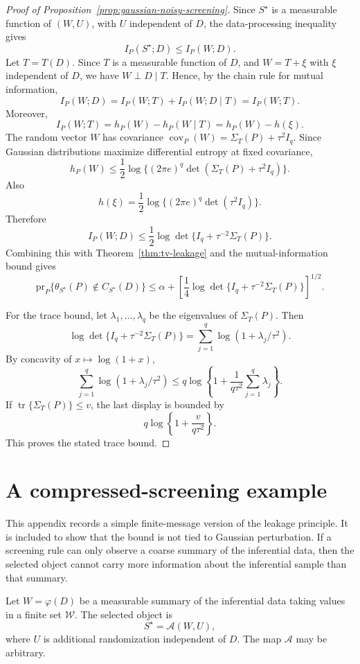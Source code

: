 \documentclass[11pt]{article}
\begin{document}
\begin{proof}[Proof of Proposition~\ref{prop:gaussian-noisy-screening}]
	Since \(S^\star\) is a measurable function of \((W,U)\), with \(U\) independent of \(D\), the data-processing inequality gives
	\[
	I_P(S^\star;D)\leq I_P(W;D).
	\]
	Let \(T=T(D)\). Since \(T\) is a measurable function of \(D\), and
	\(W=T+\xi\) with \(\xi\) independent of \(D\), we have
	\(W\perp D\mid T\). Hence, by the chain rule for mutual information,
	\[
	I_P(W;D)
	=
	I_P(W;T)+I_P(W;D\mid T)
	=
	I_P(W;T).
	\]
	Moreover,
	\[
	I_P(W;T)
	=
	h_P(W)-h_P(W\mid T)
	=
	h_P(W)-h(\xi).
	\]
	The random vector \(W\) has covariance \(\operatorname{cov}_P(W)=\Sigma_T(P)+\tau^2 I_q.\)
	Since Gaussian distributions maximize differential entropy at fixed covariance,
	\[
	h_P(W)
	\leq
	\frac12\log\{(2\pi e)^q\det(\Sigma_T(P)+\tau^2 I_q)\}.
	\]
	Also
	\[
	h(\xi)
	=
	\frac12\log\{(2\pi e)^q\det(\tau^2 I_q)\}.
	\]
	Therefore
	\[
	I_P(W;D)
	\leq
	\frac12
	\log\det\{I_q+\tau^{-2}\Sigma_T(P)\}.
	\]
	Combining this with Theorem~\ref{thm:tv-leakage} and the mutual-information bound gives
	\[
	\mathrm{pr}_P\{\theta_{S^\star}(P)\notin C_{S^\star}(D)\}
	\leq
	\alpha+
	\left[
	\frac14
	\log\det\{I_q+\tau^{-2}\Sigma_T(P)\}
	\right]^{1/2}.
	\]
	
	For the trace bound, let \(\lambda_1,\ldots,\lambda_q\) be the eigenvalues of \(\Sigma_T(P)\). Then
	\[
	\log\det\{I_q+\tau^{-2}\Sigma_T(P)\}
	=
	\sum_{j=1}^q\log(1+\lambda_j/\tau^2).
	\]
	By concavity of \(x\mapsto\log(1+x)\),
	\[
	\sum_{j=1}^q\log(1+\lambda_j/\tau^2)
	\leq
	q\log\left\{
	1+\frac{1}{q\tau^2}\sum_{j=1}^q\lambda_j
	\right\}.
	\]
	If \(\operatorname{tr}\{\Sigma_T(P)\}\leq v\), the last display is bounded by
	\[
	q\log\left\{1+\frac{v}{q\tau^2}\right\}.
	\]
	This proves the stated trace bound.
\end{proof}

\section{A compressed-screening example}
\label{app:compressed}

This appendix records a simple finite-message version of the leakage principle. It is included to show that the bound is not tied to Gaussian perturbation. If a screening rule can only observe a coarse summary of the inferential data, then the selected object cannot carry more information about the inferential sample than that summary.

Let \(W=\varphi(D)\) be a measurable summary of the inferential data taking
values in a finite set \(\mathcal W\). The selected object is
\[
S^\star=\mathcal A(W,U),
\]
where \(U\) is additional randomization independent of \(D\). The map
\(\mathcal A\) may be arbitrary.
\end{document}
